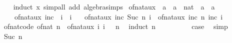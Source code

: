 \begin{isabellebody}
%
\isadelimproof
\ \ %
\endisadelimproof
%
\isatagproof
{}\isamarkupfalse%
\ {\isacharparenleft}{\kern0pt}induct\ x{\isacharparenright}{\kern0pt}\ {\isacharparenleft}{\kern0pt}simp{\isacharunderscore}{\kern0pt}all\ add{\isacharcolon}{\kern0pt}\ algebra{\isacharunderscore}{\kern0pt}simps{\isacharparenright}{\kern0pt}%
\endisatagproof
{\isafoldproof}%
%
\isadelimproof
\isanewline
%
\endisadelimproof
\isanewline
{}\isamarkupfalse%
\ of{\isacharunderscore}{\kern0pt}nat{\isacharunderscore}{\kern0pt}aux\ {\isacharcolon}{\kern0pt}{\isacharcolon}{\kern0pt}\ {\isachardoublequoteopen}{\isacharparenleft}{\kern0pt}{\isacharprime}{\kern0pt}a\ {\isasymRightarrow}\ {\isacharprime}{\kern0pt}a{\isacharparenright}{\kern0pt}\ {\isasymRightarrow}\ nat\ {\isasymRightarrow}\ {\isacharprime}{\kern0pt}a\ {\isasymRightarrow}\ {\isacharprime}{\kern0pt}a{\isachardoublequoteclose}\isanewline
\ \ \isanewline
\ \ \ \ {\isachardoublequoteopen}of{\isacharunderscore}{\kern0pt}nat{\isacharunderscore}{\kern0pt}aux\ inc\ {}\ i\ {\isacharequal}{\kern0pt}\ i{\isachardoublequoteclose}\isanewline
\ \ {\isacharbar}{\kern0pt}\ {\isachardoublequoteopen}of{\isacharunderscore}{\kern0pt}nat{\isacharunderscore}{\kern0pt}aux\ inc\ {\isacharparenleft}{\kern0pt}Suc\ n{\isacharparenright}{\kern0pt}\ i\ {\isacharequal}{\kern0pt}\ of{\isacharunderscore}{\kern0pt}nat{\isacharunderscore}{\kern0pt}aux\ inc\ n\ {\isacharparenleft}{\kern0pt}inc\ i{\isacharparenright}{\kern0pt}{\isachardoublequoteclose}\ %
\isanewline
\isanewline
{}\isamarkupfalse%
\ of{\isacharunderscore}{\kern0pt}nat{\isacharunderscore}{\kern0pt}code{\isacharcolon}{\kern0pt}\ {\isachardoublequoteopen}of{\isacharunderscore}{\kern0pt}nat\ n\ {\isacharequal}{\kern0pt}\ of{\isacharunderscore}{\kern0pt}nat{\isacharunderscore}{\kern0pt}aux\ {\isacharparenleft}{\kern0pt}{\isasymlambda}i{\isachardot}{\kern0pt}\ i\ {\isacharplus}{\kern0pt}\ {}{\isacharparenright}{\kern0pt}\ n\ {}{\isachardoublequoteclose}\isanewline
%
\isadelimproof
%
\endisadelimproof
%
\isatagproof
{}\isamarkupfalse%
\ {\isacharparenleft}{\kern0pt}induct\ n{\isacharparenright}{\kern0pt}\isanewline
\ \ \isamarkupfalse%
\ {}\isanewline
\ \ \isamarkupfalse%
\ \isamarkupfalse%
\ {\isacharquery}{\kern0pt}case\ \isamarkupfalse%
\ simp\isanewline
{}\isamarkupfalse%
\isanewline
\ \ \isamarkupfalse%
\ {\isacharparenleft}{\kern0pt}Suc\ n{\isacharparenright}{\kern0pt}\isanewline

\end{isabellebody}
